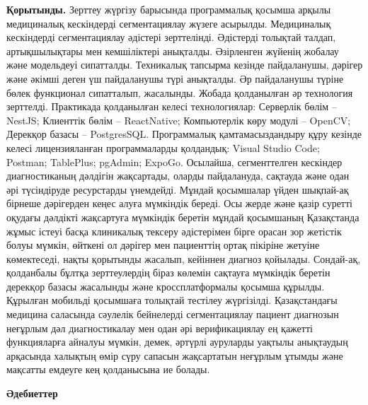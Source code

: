 {\bfseries Қорытынды.} Зерттеу жүргізу барысында программалық қосымша
арқылы медициналық кескіндерді сегментациялау жүзеге асырылды.
Медициналық кескіндерді сегментациялау әдістері зерттелінді. Әдістерді
толықтай талдап, артықшылықтары мен кемшіліктері анықталды. Әзірленген
жүйенің жобалау және модельдеуі сипатталды. Техникалық тапсырма кезінде
пайдаланушы, дәрігер және әкімші деген үш пайдаланушы түрі анықталды. Әр
пайдаланушы түріне бөлек функционал сипатталып, жасалынды. Жобада
қолданылған әр технология зерттелді. Практикада қолданылған келесі
технологиялар: Серверлік бөлім -- NestJS; Клиенттік бөлім --
ReactNative; Компьютерлік көру модулі -- OpenCV; Дерекқор базасы --
PostgresSQL. Программалық қамтамасыздандыру құру кезінде келесі
лицензияланған программаларды қолдандық: Visual Studio Code; Postman;
TablePlus; pgAdmin; ExpoGo. Осылайша, сегменттелген кескіндер
диагностиканың дәлдігін жақсартады, оларды пайдалануда, сақтауда және
одан әрі түсіндіруде ресурстарды үнемдейді. Мұндай қосымшалар үйден
шықпай-ақ бірнеше дәрігерден кеңес алуға мүмкіндік береді. Осы жерде
және қазір суретті оқудағы дәлдікті жақсартуға мүмкіндік беретін мұндай
қосымшаның Қазақстанда жұмыс істеуі басқа клиникалық тексеру әдістерімен
бірге орасан зор жетістік болуы мүмкін, өйткені ол дәрігер мен
пациенттің ортақ пікіріне жетуіне көмектеседі, нақты қорытынды жасалып,
кейіннен диагноз қойылады. Сондай-ақ, қолданбалы бұлтқа зерттеулердің
біраз көлемін сақтауға мүмкіндік беретін дерекқор базасы жасалынды және
кроссплатформалы қосымша құрылды. Құрылған мобильді қосымшаға толықтай
тестілеу жүргізілді. Қазақстандағы медицина саласында сәулелік
бейнелерді сегментациялау пациент диагнозын неғұрлым дәл диагностикалау
мен одан әрі верификациялау ең қажетті функцияларға айналуы мүмкін,
демек, әртүрлі ауруларды уақтылы анықтаудың арқасында халықтың өмір сүру
сапасын жақсартатын неғұрлым ұтымды және мақсатты емдеуге кең
қолданысына ие болады.

{\bfseries Әдебиеттер}

